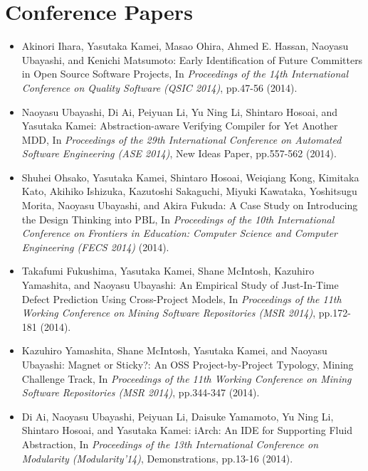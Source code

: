 \documentclass{article}
\begin{document}
\section{Conference Papers}

\begin{itemize}
\item Akinori Ihara, Yasutaka Kamei, Masao Ohira, Ahmed E. Hassan, Naoyasu Ubayashi, and Kenichi Matsumoto:
Early Identification of Future Committers in Open Source Software Projects,
In {\em Proceedings of the 14th International Conference on Quality Software (QSIC 2014)}, pp.47-56 (2014).

\item Naoyasu Ubayashi, Di Ai, Peiyuan Li, Yu Ning Li, Shintaro Hosoai, and Yasutaka Kamei:
Abstraction-aware Verifying Compiler for Yet Another MDD,
In {\em Proceedings of the 29th International Conference on Automated Software Engineering (ASE 2014)}, New Ideas Paper, pp.557-562 (2014).

\item Shuhei Ohsako, Yasutaka Kamei, Shintaro Hosoai, Weiqiang Kong, Kimitaka Kato, Akihiko Ishizuka, Kazutoshi Sakaguchi, Miyuki Kawataka, Yoshitsugu Morita, Naoyasu Ubayashi, and Akira Fukuda:
A Case Study on Introducing the Design Thinking into PBL,
In {\em Proceedings of the 10th International Conference on Frontiers in Education: Computer Science and Computer Engineering  (FECS 2014)} (2014).

\item Takafumi Fukushima, Yasutaka Kamei, Shane McIntosh, Kazuhiro Yamashita, and Naoyasu Ubayashi:
An Empirical Study of Just-In-Time Defect Prediction Using Cross-Project Models,
In {\em Proceedings of the 11th Working Conference on Mining Software Repositories (MSR 2014)}, pp.172-181 (2014).

\item Kazuhiro Yamashita, Shane McIntosh, Yasutaka Kamei, and Naoyasu Ubayashi:
Magnet or Sticky?: An OSS Project-by-Project Typology,
Mining Challenge Track,
In {\em Proceedings of the 11th Working Conference on Mining Software Repositories (MSR 2014)}, pp.344-347 (2014).

\item Di Ai, Naoyasu Ubayashi, Peiyuan Li, Daisuke Yamamoto, Yu Ning Li, Shintaro Hosoai, and Yasutaka Kamei:
iArch: An IDE for Supporting Fluid Abstraction,
In {\em Proceedings of the 13th International Conference on Modularity (Modularity'14)}, Demonstrations, pp.13-16 (2014).


\end{itemize}
\end{document}
